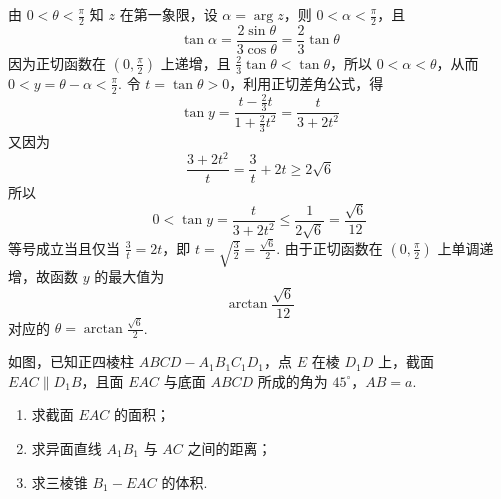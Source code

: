 \documentclass[UTF8,a4paper,oneside,11pt]{ctexbook}
\begin{document}
\begin{solution}
由 \(0<\theta<\frac\pi2\) 知 \(z\) 在第一象限，设 \(\alpha=\arg z\)，则 \(0<\alpha<\frac\pi2\)，且
\[
\tan\alpha=\frac{2\sin\theta}{3\cos\theta}=\frac23\tan\theta
\]
因为正切函数在 \(\left(0,\frac\pi2\right)\) 上递增，且 \(\frac23\tan\theta<\tan\theta\)，所以 \(0<\alpha<\theta\)，从而 \(0<y=\theta-\alpha<\frac\pi2\). 令 \(t=\tan\theta>0\)，利用正切差角公式，得
\[
\tan y=\frac{t-\frac23t}{1+\frac23t^2}=\frac{t}{3+2t^2}
\]
又因为
\[
\frac{3+2t^2}{t}=\frac3t+2t\geqslant2\sqrt6
\]
所以
\[
0<\tan y=\frac{t}{3+2t^2}\leqslant\frac1{2\sqrt6}=\frac{\sqrt6}{12}
\]
等号成立当且仅当 \(\frac3t=2t\)，即 \(t=\sqrt{\frac32}=\frac{\sqrt6}{2}\). 由于正切函数在 \(\left(0,\frac\pi2\right)\) 上单调递增，故函数 \(y\) 的最大值为
\[
\arctan\frac{\sqrt6}{12}
\]
对应的 \(\theta=\arctan\frac{\sqrt6}{2}\).
\end{solution}

\begin{problem}
如图，已知正四棱柱 \(ABCD-A_1B_1C_1D_1\)，点 \(E\) 在棱 \(D_1D\) 上，截面 \(EAC\parallel D_1B\)，且面 \(EAC\) 与底面 \(ABCD\) 所成的角为 \(45^\circ\)，\(AB=a\).

\begin{enumerate}
\item 求截面 \(EAC\) 的面积；
\item 求异面直线 \(A_1B_1\) 与 \(AC\) 之间的距离；
\item 求三棱锥 \(B_1-EAC\) 的体积.
\end{enumerate}

\end{problem}
\end{document}
